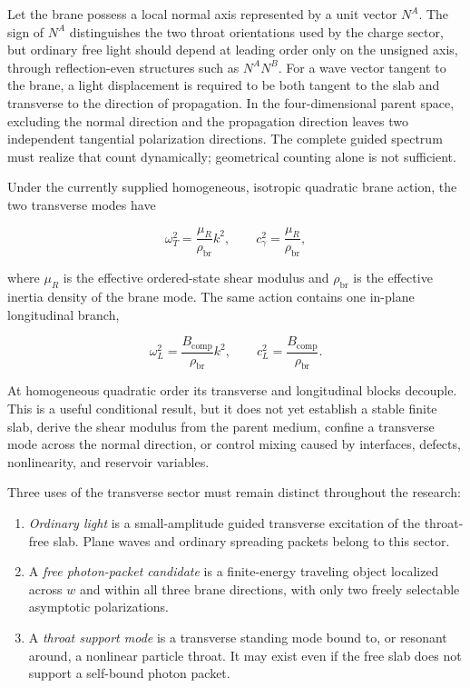 Let the brane possess a local normal axis represented by a unit vector
\(N^A\). The sign of \(N^A\) distinguishes the two throat orientations used by
the charge sector, but ordinary free light should depend at leading order only
on the unsigned axis, through reflection-even structures such as \(N^A N^B\).
For a wave vector tangent to the brane, a light displacement is required to be
both tangent to the slab and transverse to the direction of propagation. In the
four-dimensional parent space, excluding the normal direction and the
propagation direction leaves two independent tangential polarization
directions. The complete guided spectrum must realize that count dynamically;
geometrical counting alone is not sufficient.

Under the currently supplied homogeneous, isotropic quadratic brane action, the
two transverse modes have

\[
\omega_T^2
=
\frac{\mu_R}{\rho_{\mathrm{br}}}k^2,
\qquad
c_\gamma^2
=
\frac{\mu_R}{\rho_{\mathrm{br}}},
\]

where \(\mu_R\) is the effective ordered-state shear modulus and
\(\rho_{\mathrm{br}}\) is the effective inertia density of the brane mode. The
same action contains one in-plane longitudinal branch,

\[
\omega_L^2
=
\frac{B_{\mathrm{comp}}}{\rho_{\mathrm{br}}}k^2,
\qquad
c_L^2
=
\frac{B_{\mathrm{comp}}}{\rho_{\mathrm{br}}}.
\]

At homogeneous quadratic order its transverse and longitudinal blocks decouple. This is a useful
conditional result, but it does not yet establish a stable finite slab, derive
the shear modulus from the parent medium, confine a transverse mode across the
normal direction, or control mixing caused by interfaces, defects,
nonlinearity, and reservoir variables.

Three uses of the transverse sector must remain distinct throughout the
research:

\begin{enumerate}[leftmargin=2.2em,itemsep=0.35em]
  \item \emph{Ordinary light} is a small-amplitude guided transverse excitation
        of the throat-free slab. Plane waves and ordinary spreading packets
        belong to this sector.
  \item A \emph{free photon-packet candidate} is a finite-energy traveling
        object localized across \(w\) and within all three brane directions,
        with only two freely selectable asymptotic polarizations.
  \item A \emph{throat support mode} is a transverse standing mode bound to, or
        resonant around, a nonlinear particle throat. It may exist even if the
        free slab does not support a self-bound photon packet.
\end{enumerate}

